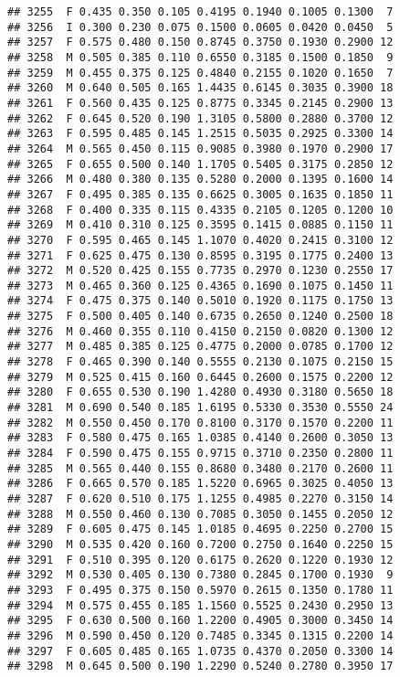 \documentclass[
]{article}
\begin{document}
\begin{verbatim}
## 3255  F 0.435 0.350 0.105 0.4195 0.1940 0.1005 0.1300  7
## 3256  I 0.300 0.230 0.075 0.1500 0.0605 0.0420 0.0450  5
## 3257  F 0.575 0.480 0.150 0.8745 0.3750 0.1930 0.2900 12
## 3258  M 0.505 0.385 0.110 0.6550 0.3185 0.1500 0.1850  9
## 3259  M 0.455 0.375 0.125 0.4840 0.2155 0.1020 0.1650  7
## 3260  M 0.640 0.505 0.165 1.4435 0.6145 0.3035 0.3900 18
## 3261  F 0.560 0.435 0.125 0.8775 0.3345 0.2145 0.2900 13
## 3262  F 0.645 0.520 0.190 1.3105 0.5800 0.2880 0.3700 12
## 3263  F 0.595 0.485 0.145 1.2515 0.5035 0.2925 0.3300 14
## 3264  M 0.565 0.450 0.115 0.9085 0.3980 0.1970 0.2900 17
## 3265  F 0.655 0.500 0.140 1.1705 0.5405 0.3175 0.2850 12
## 3266  M 0.480 0.380 0.135 0.5280 0.2000 0.1395 0.1600 14
## 3267  F 0.495 0.385 0.135 0.6625 0.3005 0.1635 0.1850 11
## 3268  F 0.400 0.335 0.115 0.4335 0.2105 0.1205 0.1200 10
## 3269  M 0.410 0.310 0.125 0.3595 0.1415 0.0885 0.1150 11
## 3270  F 0.595 0.465 0.145 1.1070 0.4020 0.2415 0.3100 12
## 3271  F 0.625 0.475 0.130 0.8595 0.3195 0.1775 0.2400 13
## 3272  M 0.520 0.425 0.155 0.7735 0.2970 0.1230 0.2550 17
## 3273  M 0.465 0.360 0.125 0.4365 0.1690 0.1075 0.1450 11
## 3274  F 0.475 0.375 0.140 0.5010 0.1920 0.1175 0.1750 13
## 3275  F 0.500 0.405 0.140 0.6735 0.2650 0.1240 0.2500 18
## 3276  M 0.460 0.355 0.110 0.4150 0.2150 0.0820 0.1300 12
## 3277  M 0.485 0.385 0.125 0.4775 0.2000 0.0785 0.1700 12
## 3278  F 0.465 0.390 0.140 0.5555 0.2130 0.1075 0.2150 15
## 3279  M 0.525 0.415 0.160 0.6445 0.2600 0.1575 0.2200 12
## 3280  F 0.655 0.530 0.190 1.4280 0.4930 0.3180 0.5650 18
## 3281  M 0.690 0.540 0.185 1.6195 0.5330 0.3530 0.5550 24
## 3282  M 0.550 0.450 0.170 0.8100 0.3170 0.1570 0.2200 11
## 3283  F 0.580 0.475 0.165 1.0385 0.4140 0.2600 0.3050 13
## 3284  F 0.590 0.475 0.155 0.9715 0.3710 0.2350 0.2800 11
## 3285  M 0.565 0.440 0.155 0.8680 0.3480 0.2170 0.2600 11
## 3286  F 0.665 0.570 0.185 1.5220 0.6965 0.3025 0.4050 13
## 3287  F 0.620 0.510 0.175 1.1255 0.4985 0.2270 0.3150 14
## 3288  M 0.550 0.460 0.130 0.7085 0.3050 0.1455 0.2050 12
## 3289  F 0.605 0.475 0.145 1.0185 0.4695 0.2250 0.2700 15
## 3290  M 0.535 0.420 0.160 0.7200 0.2750 0.1640 0.2250 15
## 3291  F 0.510 0.395 0.120 0.6175 0.2620 0.1220 0.1930 12
## 3292  M 0.530 0.405 0.130 0.7380 0.2845 0.1700 0.1930  9
## 3293  F 0.495 0.375 0.150 0.5970 0.2615 0.1350 0.1780 11
## 3294  M 0.575 0.455 0.185 1.1560 0.5525 0.2430 0.2950 13
## 3295  F 0.630 0.500 0.160 1.2200 0.4905 0.3000 0.3450 14
## 3296  M 0.590 0.450 0.120 0.7485 0.3345 0.1315 0.2200 14
## 3297  F 0.605 0.485 0.165 1.0735 0.4370 0.2050 0.3300 14
## 3298  M 0.645 0.500 0.190 1.2290 0.5240 0.2780 0.3950 17

\end{verbatim}
\end{document}
